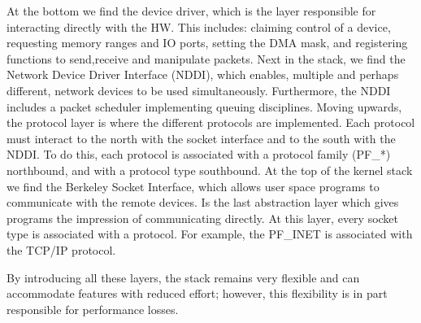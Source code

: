 \documentclass[conference]{IEEEtran}
\begin{document}
At the bottom we find the device driver, which is the layer responsible for interacting directly with the HW. This includes: claiming control of a device, requesting memory ranges and IO ports, setting the DMA mask, and registering functions to send,receive and manipulate packets. Next in the stack, we find the Network Device Driver Interface (NDDI), which enables, multiple and perhaps different, network devices to be used simultaneously. Furthermore, the NDDI includes a packet scheduler implementing queuing disciplines. Moving upwards, the protocol layer is where the different protocols are implemented. Each protocol must interact to the north with the socket interface and to the south with the NDDI. To do this, each protocol is associated with a protocol family (PF\_*) northbound, and with a protocol type southbound. At the top of the kernel stack we find the Berkeley Socket Interface, which allows user space programs to communicate with the remote devices. Is the last abstraction layer which gives programs the impression of communicating directly. At this layer, every socket type is associated with a protocol. For example, the PF\_INET is associated with the TCP/IP protocol.

By introducing all these layers, the stack remains very flexible and can accommodate features with reduced effort; however, this flexibility is in part responsible for performance losses.
\end{document}
